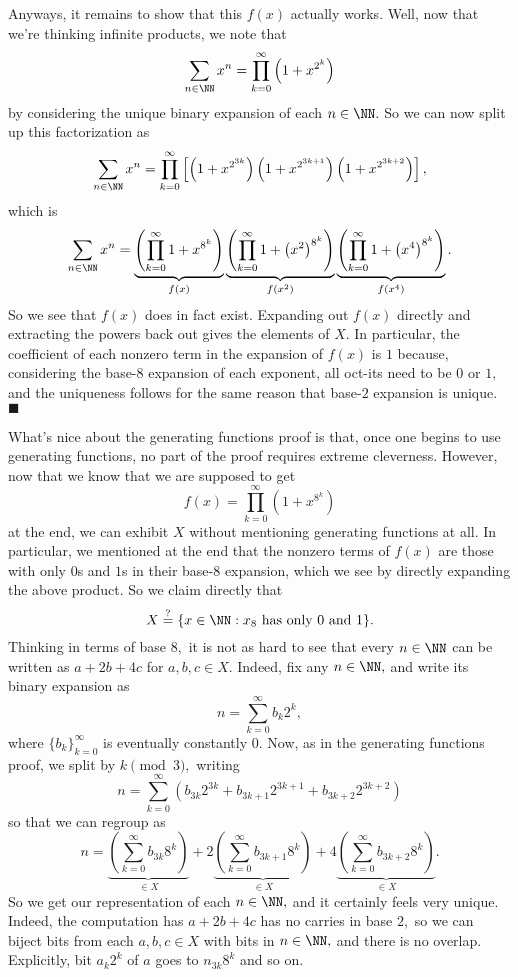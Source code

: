 Anyways, it remains to show that this $f(x)$ actually works. Well, now that we're thinking infinite products, we note that
\[\sum_{n\in\NN}x^n=\prod_{k=0}^\infty\left(1+x^{2^k}\right)\]
by considering the unique binary expansion of each $n\in\NN.$ So we can now split up this factorization as
\[\sum_{n\in\NN}x^n=\prod_{k=0}^\infty\left[\left(1+x^{2^{3k}}\right)\left(1+x^{2^{3k+1}}\right)\left(1+x^{2^{3k+2}}\right)\right],\]
which is
\[\sum_{n\in\NN}x^n=\underbrace{\left(\prod_{k=0}^\infty1+x^{8^k}\right)}_{f(x)}\underbrace{\left(\prod_{k=0}^\infty1+\left(x^2\right)^{8^k}\right)}_{f(x^2)}\underbrace{\left(\prod_{k=0}^\infty1+\left(x^4\right)^{8^k}\right)}_{f(x^4)}.\]
So we see that $f(x)$ does in fact exist. Expanding out $f(x)$ directly and extracting the powers back out gives the elements of $X.$ In particular, the coefficient of each nonzero term in the expansion of $f(x)$ is $1$ because, considering the base-$8$ expansion of each exponent, all oct-its need to be $0$ or $1,$ and the uniqueness follows for the same reason that base-$2$ expansion is unique. $\blacksquare$

What's nice about the generating functions proof is that, once one begins to use generating functions, no part of the proof requires extreme cleverness. However, now that we know that we are supposed to get
\[f(x)=\prod_{k=0}^\infty\left(1+x^{8^k}\right)\]
at the end, we can exhibit $X$ without mentioning generating functions at all. In particular, we mentioned at the end that the nonzero terms of $f(x)$ are those with only $0$s and $1$s in their base-$8$ expansion, which we see by directly expanding the above product. So we claim directly that
\[X\stackrel?=\{x\in\NN:x_8\text{ has only }0\text{ and }1\}.\]
Thinking in terms of base $8,$ it is not as hard to see that every $n\in\NN$ can be written as $a+2b+4c$ for $a,b,c\in X.$ Indeed, fix any $n\in\NN,$ and write its binary expansion as
\[n=\sum_{k=0}^\infty b_k2^k,\]
where $\{b_k\}_{k=0}^\infty$ is eventually constantly $0.$ Now, as in the generating functions proof, we split by $k\pmod3,$ writing
\[n=\sum_{k=0}^\infty\left(b_{3k}2^{3k}+b_{3k+1}2^{3k+1}+b_{3k+2}2^{3k+2}\right)\]
so that we can regroup as
\[n=\underbrace{\left(\sum_{k=0}^\infty b_{3k}8^k\right)}_{\in X}+2\underbrace{\left(\sum_{k=0}^\infty b_{3k+1}8^k\right)}_{\in X}+4\underbrace{\left(\sum_{k=0}^\infty b_{3k+2}8^k\right)}_{\in X}.\]
So we get our representation of each $n\in\NN,$ and it certainly feels very unique. Indeed, the computation has $a+2b+4c$ has no carries in base $2,$ so we can biject bits from each $a,b,c\in X$ with bits in $n\in\NN,$ and there is no overlap. Explicitly, bit $a_k2^k$ of $a$ goes to $n_{3k}8^k$ and so on.

